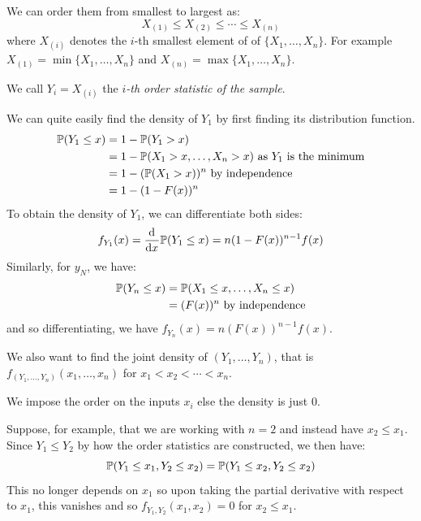 \documentclass[../main.tex]{subfiles}
\begin{document}
We can order them from smallest to largest as:
\[
  X_{(1)} \leq X_{(2)} \leq \cdots \leq X_{(n)}
\]
where $X_{(i)}$ denotes the $i$-th smallest element of of $\{X_1, \ldots, X_n\}$.
For example $X_{(1)} = \min\{X_1, \ldots, X_n\}$ and $X_{(n)} = \max\{X_1, \ldots, X_n\}$.
\begin{definition}
  We call $Y_i = X_{(i)}$ the \textit{$i$-th order statistic of the sample}.
\end{definition}
We can quite easily find the density of $Y_1$ by first finding its distribution function.
\begin{align*}
  \P(Y_1 \leq x) &= 1 - \P(Y_1 > x) \\
                 &= 1 - \P(X_1 > x, \ldots, X_n > x) \text{ as $Y_1$ is the minimum}\\
                 &= 1 - (\P(X_1 > x))^{n} \text{ by independence} \\
                 &= 1 - (1 - F(x))^{n}
\end{align*}
To obtain the density of $Y_1$, we can differentiate both sides:
\[
  f_{Y_1}(x) = \deriv{}{x}\P(Y_1 \leq x) = n(1 - F(x))^{n - 1}f(x)
\]
Similarly, for $y_N$, we have:
\begin{align*}
  \P(Y_n \leq x) &= \P(X_1 \leq x, \ldots, X_n \leq x) \\
                 &= (F(x))^{n} \text{ by independence}
\end{align*}
and so differentiating, we have $f_{Y_n}(x) = n(F(x))^{n-1}f(x)$.

We also want to find the joint density of $(Y_1, \ldots, Y_n)$, that is $f_{(Y_1, \ldots, Y_n)}(x_1, \ldots, x_n)$ for $x_1 < x_2 < \cdots < x_n$.
\begin{remark}[Note]
  We impose the order on the inputs $x_i$ else the density is just $0$.

  Suppose, for example, that we are working with $n = 2$ and instead have $x_2 \leq x_1$.
  Since $Y_1 \leq Y_2$ by how the order statistics are constructed, we then have:
  \[
    \P(Y_1 \leq x_1, Y_2 \leq x_2) = \P(Y_1 \leq x_2, Y_2 \leq x_2)
  \]
  This no longer depends on $x_1$ so upon taking the partial derivative with respect to $x_1$, this vanishes and so $f_{Y_1, Y_2}(x_1, x_2) = 0$ for $x_2 \leq x_1$.
\end{remark}
\end{document}
